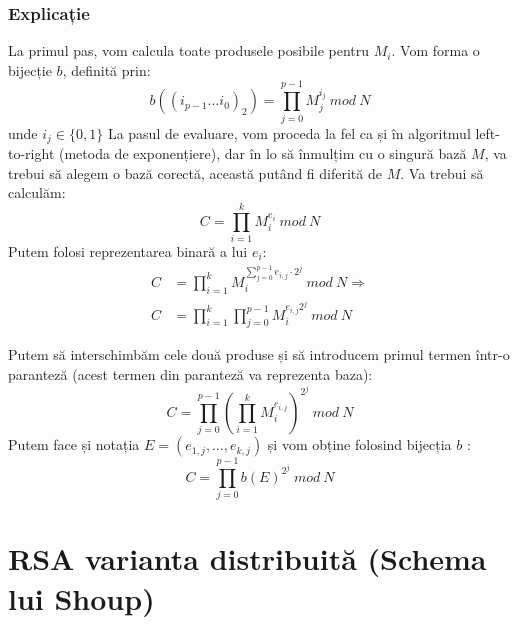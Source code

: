 \documentclass[12pt, oneside]{book}
\begin{document}
		   \subsubsection{Explicație}
		   La primul pas, vom calcula toate produsele posibile pentru $M_i$. Vom forma o bijecție $b$, definită prin: \\
		   $$ b((i_{p-1} \dots i_0)_2)= \prod_{j=0}^{p-1} M^{i_j}_{j} \ mod \ N$$
		   unde $i_j \in \lbrace  0,1  \rbrace $
		   La pasul de evaluare, vom proceda la fel ca și în algoritmul left-to-right (metoda de exponențiere), dar în lo să înmulțim cu o singură bază $M$, va trebui să alegem o bază corectă, această putând fi diferită de $M$. Va trebui să calculăm: 
		   $$ C = \prod_{i=1}^{k} M_{i}^{e_i} \ mod \ N$$
		   Putem folosi reprezentarea binară a lui $e_i$:
		   \begin{align*}
		    C &= \prod_{i=1}^{k} M_{i}^{\sum_{j=0}^{p-1} e_{i,j} \cdot   2^j} \ mod \ N \Rightarrow \\
		    C &= \prod_{i=1}^{k} \prod_{j=0}^{p-1} M_{i}^{e_{i,j}2^j} \ mod \ N
		   \end{align*}
		   
		   Putem să interschimbăm cele două produse și să introducem primul termen într-o paranteză (acest termen din paranteză va reprezenta baza):
		   $$C = \prod_{j=0}^{p-1} \left(   \prod_{i=1}^{k} M_{i}^{e_{i,j}}     \right)^{2^j} \ mod \ N $$
		   Putem face și notația $E=(e_{1,j}, \dots ,e_{k,j})$ și vom obține folosind bijecția $b$ :
		   $$ C = \prod_{j=0}^{p-1} b(E)^{2^j}  \ mod \ N$$


\section{RSA varianta distribuită (Schema lui Shoup)}
\end{document}
